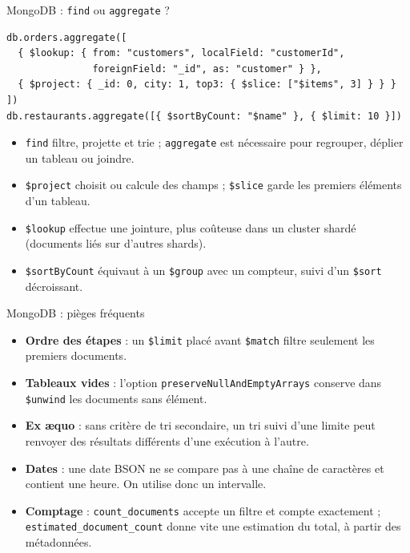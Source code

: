 \begin{frame}[fragile]{MongoDB : \texttt{find} ou \texttt{aggregate} ?}
    \begin{verbatim}
db.orders.aggregate([
  { $lookup: { from: "customers", localField: "customerId",
               foreignField: "_id", as: "customer" } },
  { $project: { _id: 0, city: 1, top3: { $slice: ["$items", 3] } } }
])
db.restaurants.aggregate([{ $sortByCount: "$name" }, { $limit: 10 }])
\end{verbatim}
    \begin{itemize}
        \item \texttt{find} filtre, projette et trie ; \texttt{aggregate} est
              nécessaire pour regrouper, déplier un tableau ou joindre.
        \item \texttt{\$project} choisit ou calcule des champs ;
              \texttt{\$slice} garde les premiers éléments d'un tableau.
        \item \texttt{\$lookup} effectue une jointure, plus coûteuse dans un
              cluster shardé (documents liés sur d'autres shards).
        \item \texttt{\$sortByCount} équivaut à un \texttt{\$group} avec un
              compteur, suivi d'un \texttt{\$sort} décroissant.
    \end{itemize}
\end{frame}

\begin{frame}{MongoDB : pièges fréquents}
    \begin{itemize}
        \item \textbf{Ordre des étapes} : un \texttt{\$limit} placé avant
              \texttt{\$match} filtre seulement les premiers documents.
        \item \textbf{Tableaux vides} : l'option
              \texttt{preserveNullAndEmptyArrays} conserve dans
              \texttt{\$unwind} les documents sans élément.
        \item \textbf{Ex æquo} : sans critère de tri secondaire, un tri suivi
              d'une limite peut renvoyer des résultats différents d'une
              exécution à l'autre.
        \item \textbf{Dates} : une date BSON ne se compare pas à une chaîne de
              caractères et contient une heure. On utilise donc un intervalle.
        \item \textbf{Comptage} : \texttt{count\_documents} accepte un filtre et
              compte exactement ; \texttt{estimated\_document\_count} donne vite
              une estimation du total, à partir des métadonnées.
    \end{itemize}
\end{frame}

